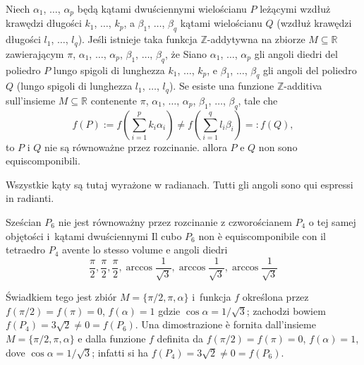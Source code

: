 \begin{theorem}
[Hadwigera] %
[di Hadwiger] %
    Niech $\alpha_1$, $\ldots$, $\alpha_p$ będą kątami dwuściennymi wielościanu $P$ leżącymi wzdłuż krawędzi długości $k_1$, $\ldots$, $k_p$, a $\beta_1$, $\ldots$, $\beta_q$ kątami wielościanu $Q$ (wzdłuż krawędzi długości $l_1$, $\ldots$, $l_q$). %
    Jeśli istnieje taka funkcja $\mathbb Z$-addytywna na zbiorze $M \subseteq \mathbb R$ zawierającym $\pi$, $\alpha_1$, $\ldots$, $\alpha_p$, $\beta_1$, $\ldots$, $\beta_q$, że %
    Siano $\alpha_1$, $\ldots$, $\alpha_p$ gli angoli diedri del poliedro $P$ lungo spigoli di lunghezza $k_1$, $\ldots$, $k_p$, e $\beta_1$, $\ldots$, $\beta_q$ gli angoli del poliedro $Q$ (lungo spigoli di lunghezza $l_1$, $\ldots$, $l_q$). %
    Se esiste una funzione $\mathbb Z$-additiva sull'insieme $M \subseteq \mathbb R$ contenente $\pi$, $\alpha_1$, $\ldots$, $\alpha_p$, $\beta_1$, $\ldots$, $\beta_q$, tale che %
    \begin{equation}
        f(P) := f\left(\sum_{i = 1}^p k_i \alpha_i\right) \neq f\left(\sum_{i = 1}^q l_i \beta_i\right) =: f(Q),
    \end{equation}
    to $P$ i $Q$ nie są równoważne przez rozcinanie. %
    allora $P$ e $Q$ non sono equiscomponibili. %
\end{theorem}

Wszystkie kąty są tutaj wyrażone w radianach. %
Tutti gli angoli sono qui espressi in radianti. %

\begin{example}
    Sześcian $P_6$ nie jest równoważny przez rozcinanie z czworościanem $P_4$ o tej samej objętości i~kątami dwuściennymi %
    Il cubo $P_6$ non è equiscomponibile con il tetraedro $P_4$ avente lo stesso volume e angoli diedri %
    \begin{equation}
        \frac \pi 2, \frac \pi 2, \frac \pi 2,
        \arccos \frac{1}{\sqrt 3}, \arccos \frac{1}{\sqrt 3}, \arccos \frac{1}{\sqrt 3}
    \end{equation}

    Świadkiem tego jest zbiór $M = \{\pi/2, \pi, \alpha\}$ i~funkcja $f$ określona przez $f(\pi/2) = f(\pi) = 0$, $f(\alpha) = 1$ gdzie $\cos \alpha = 1/\sqrt{3}$; zachodzi bowiem $f(P_4) = 3 \sqrt 2 \neq 0 = f(P_6)$. %
    Una dimostrazione è fornita dall'insieme $M = \{\pi/2, \pi, \alpha\}$ e dalla funzione $f$ definita da $f(\pi/2) = f(\pi) = 0$, $f(\alpha) = 1$, dove $\cos \alpha = 1/\sqrt{3}$; infatti si ha $f(P_4) = 3 \sqrt 2 \neq 0 = f(P_6)$. %
\end{example}

